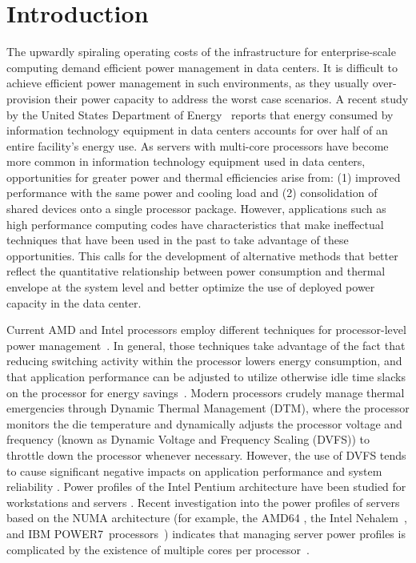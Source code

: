 %
%
\chapter{Introduction}
\label{sec:Introduction}
The upwardly spiraling operating costs of the infrastructure for
enterprise-scale computing demand efficient power management in data centers.
It is difficult to achieve efficient power management in
such environments, as they usually over-provision their power capacity to
address the worst case scenarios.  A recent study by the United States
Department of Energy~\cite{DOE2011} reports that energy consumed by
information technology equipment in data centers accounts for over half
of an entire facility's energy use.  As servers with multi-core
processors have become more common in information technology equipment
used in data centers, opportunities for greater power and thermal
efficiencies arise from: (1) improved performance with the same power
and cooling load and (2) consolidation of shared devices onto a single
processor package. However, applications such as high performance
computing codes have characteristics that make ineffectual
techniques that have been used in the past to take advantage of these
opportunities. This calls for the development of alternative methods
that better reflect the quantitative relationship between power
consumption and thermal envelope at the system level and better optimize
the use of deployed power capacity in the data center.

Current AMD and Intel processors employ different techniques for
processor-level power management~\cite{AMD2008b,Intel2009}. In general,
those techniques take advantage of the fact that reducing switching
activity within the processor lowers energy consumption, and that
application performance can be adjusted to utilize otherwise idle time
slacks on the processor for energy savings~\cite{Contreras2005}. Modern
processors crudely manage thermal emergencies through Dynamic Thermal
Management (DTM), where the processor monitors the die temperature and
dynamically adjusts the processor voltage and frequency (known as
Dynamic Voltage and Frequency Scaling (DVFS)) to throttle down the
processor whenever necessary. However, the use of DVFS tends to cause
significant negative impacts on application performance and system
reliability \cite{Donald2006,Bircher2008,Coskun2008d}. Power profiles of
the Intel Pentium architecture have been studied for workstations
\cite{Isci2003a,Isci2003b,Isci2006} and servers
\cite{Bircher2004,Bircher2007,Lee2005}. Recent investigation into the
power profiles of servers based on the NUMA architecture (for example,
the AMD64 \cite{AMD2007}, the Intel Nehalem~\cite{Intel2009}, and IBM
POWER7~processors~\cite{Ware2010,Brochard2010}) indicates that managing
server power profiles is complicated by the existence of multiple cores
per
processor~\cite{Kansal2010,Tsirogiannis2010,Lewis2010,McCullough2011}.

